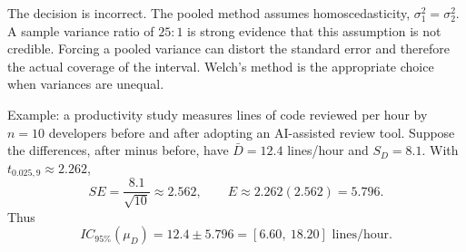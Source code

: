 \begin{solproblema}[prob:4b6b800]
The decision is incorrect. The pooled method assumes homoscedasticity, $\sigma_1^2=\sigma_2^2$. A sample variance ratio of $25{:}1$ is strong evidence that this assumption is not credible. Forcing a pooled variance can distort the standard error and therefore the actual coverage of the interval. Welch's method is the appropriate choice when variances are unequal.
\end{solproblema}

\begin{solproblema}[prob:ae13605]
Example: a productivity study measures lines of code reviewed per hour by $n=10$ developers before and after adopting an AI-assisted review tool. Suppose the differences, after minus before, have $\bar D=12.4$ lines/hour and $S_D=8.1$. With $t_{0.025,9}\approx2.262$,
\[
	SE=\frac{8.1}{\sqrt{10}}\approx2.562,\qquad E\approx2.262(2.562)=5.796.
\]
Thus
\[
	IC_{95\%}(\mu_D)=12.4\pm5.796=[6.60,\ 18.20]\text{ lines/hour}.
\]
\end{solproblema}
